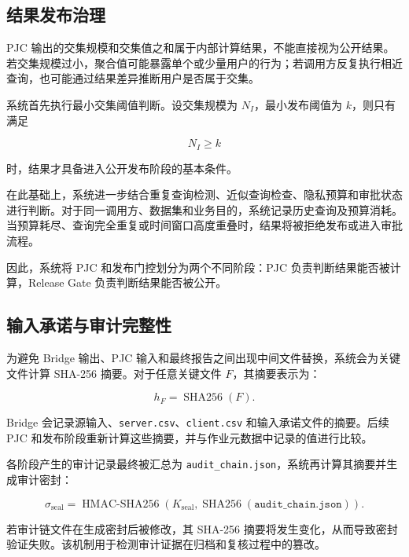 \documentclass[UTF8,a4paper,12pt,oneside]{ctexrep}
\begin{document}
\subsection{结果发布治理}

PJC 输出的交集规模和交集值之和属于内部计算结果，不能直接视为公开结果。若交集规模过小，聚合值可能暴露单个或少量用户的行为；若调用方反复执行相近查询，也可能通过结果差异推断用户是否属于交集。

系统首先执行最小交集阈值判断。设交集规模为 $N_I$，最小发布阈值为 $k$，则只有满足

\begin{equation}
N_I\geq k
\end{equation}

时，结果才具备进入公开发布阶段的基本条件。

在此基础上，系统进一步结合重复查询检测、近似查询检查、隐私预算和审批状态进行判断。对于同一调用方、数据集和业务目的，系统记录历史查询及预算消耗。当预算耗尽、查询完全重复或时间窗口高度重叠时，结果将被拒绝发布或进入审批流程。

因此，系统将 PJC 和发布门控划分为两个不同阶段：PJC 负责判断结果能否被计算，Release Gate 负责判断结果能否被公开。

\subsection{输入承诺与审计完整性}

为避免 Bridge 输出、PJC 输入和最终报告之间出现中间文件替换，系统会为关键文件计算 SHA-256 摘要。对于任意关键文件 $F$，其摘要表示为：

\begin{equation}
h_F=\operatorname{SHA256}(F).
\end{equation}

Bridge 会记录源输入、\texttt{server.csv}、\texttt{client.csv} 和输入承诺文件的摘要。后续 PJC 和发布阶段重新计算这些摘要，并与作业元数据中记录的值进行比较。

各阶段产生的审计记录最终被汇总为 \texttt{audit\_chain.json}，系统再计算其摘要并生成审计密封：

\begin{equation}
\sigma_{\mathrm{seal}}
=
\operatorname{HMAC\text{-}SHA256}
\left(
K_{\mathrm{seal}},
\operatorname{SHA256}
(\texttt{audit\_chain.json})
\right).
\end{equation}

若审计链文件在生成密封后被修改，其 SHA-256 摘要将发生变化，从而导致密封验证失败。该机制用于检测审计证据在归档和复核过程中的篡改。
\end{document}
